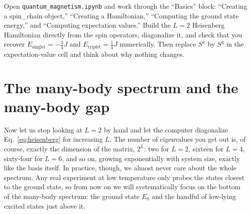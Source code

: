 \documentclass[all_sessions.tex]{subfiles}
\begin{document}
\begin{notebook}
Open \texttt{quantum\_magnetism.ipynb} and work through the ``Basics'' block: ``Creating a
spin\_chain object,'' ``Creating a Hamiltonian,'' ``Computing the ground state energy,'' and
``Computing expectation values.'' Build the $L=2$ Heisenberg Hamiltonian directly from the spin
operators, diagonalize it, and check that you recover $E_{\mathrm{singlet}}=-\tfrac34J$ and
$E_{\mathrm{triplet}}=\tfrac14J$ numerically. Then replace $S^x$ by $S^y$ in the expectation-value cell
and think about why nothing changes.
\end{notebook}

\section{The many-body spectrum and the many-body gap}
\label{sec:gap}
Now let us stop looking at $L=2$ by hand and let the computer diagonalize Eq.~\eqref{eq:heisenberg} for
increasing $L$. The number of eigenvalues you get out is, of course, exactly the dimension of the
matrix, $2^L$: two for $L=2$, sixteen for $L=4$, sixty-four for $L=6$, and so on, growing exponentially
with system size, exactly like the basis itself. In practice, though, we almost never care about the
whole spectrum. Any real experiment at low temperature only probes the states closest to the ground
state, so from now on we will systematically focus on the bottom of the many-body spectrum: the ground
state $E_0$ and the handful of low-lying excited states just above it.
\end{document}
